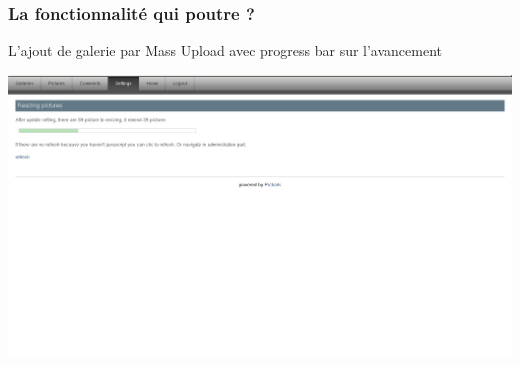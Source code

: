 \documentclass{beamer}
\begin{document}
\begin{frame}
    \frametitle{La fonctionnalité qui poutre ?}
    L'ajout de galerie par Mass Upload avec progress bar sur l'avancement

    \begin{center}
    \includegraphics[scale=.4]{progress_bar.png}
    \end{center}

\end{frame}
\end{document}
